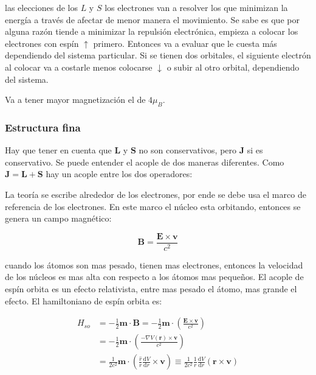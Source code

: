 \documentclass[11pt,fleqn]{book}
\renewcommand{\vec}[1]{\mathbf{#1}}
\begin{document}
las elecciones de los $L$ y $S$ los electrones van a resolver los que minimizan la energía a través de afectar de menor manera el movimiento. Se sabe es que por alguna razón tiende a minimizar la repulsión electrónica, empieza a colocar los electrones con espín $\uparrow$ primero. Entonces va a evaluar que le cuesta más dependiendo del sistema particular. Si se tienen dos orbitales, el siguiente electrón al colocar va a costarle menos colocarse $\downarrow$ o subir al otro orbital, dependiendo del sistema.



Va a tener mayor magnetización el de $4\mu_{B}$.

\subsubsection{Estructura fina}

Hay que tener en cuenta que $\vec{L}$ y $\vec{S}$ no son conservativos, pero $\vec{J}$ si es conservativo. Se puede entender el acople de dos maneras diferentes. Como $\vec{J}=\vec{L}+\vec{S}$ hay un acople entre los dos operadores:


La teoría se escribe alrededor de los electrones, por ende se debe usa el marco de referencia de los electrones. En este marco el núcleo esta orbitando, entonces se genera un campo magnético:

\begin{equation}
    \vec{B}=\frac{\vec{E}\times\vec{v}}{c^{2}}
    \label{Eq. 3.34}
\end{equation}

cuando los átomos son mas pesado, tienen mas electrones, entonces la velocidad de los núcleos es mas alta con respecto a los átomos mas pequeños. El acople de espín orbita es un efecto relativista, entre mas pesado el átomo, mas grande el efecto. El hamiltoniano de espín orbita es:

\begin{equation}
\begin{split}
     H_{so}&=-\frac{1}{2}\vec{m}\cdot\vec{B}=-\frac{1}{2}\vec{m}\cdot\left(\frac{\vec{E}\times\vec{v}}{c^{2}}\right)\\
     &=-\frac{1}{2}\vec{m}\cdot\left(\frac{-\nabla V(\vec{r})\times\vec{v}}{c^{2}}\right)\\
     &=\frac{1}{2c^{2}}\vec{m}\cdot\left(\frac{\hat{r}}{r}\frac{\mathrm{d}V}{\mathrm{d}r}\times\vec{v}\right)\equiv\frac{1}{2c^{2}}\frac{1}{r}\frac{\mathrm{d}V}{\mathrm{d}r}(\vec{r}\times\vec{v})
\end{split}
    \label{Eq. 3.35}
\end{equation}
\end{document}
